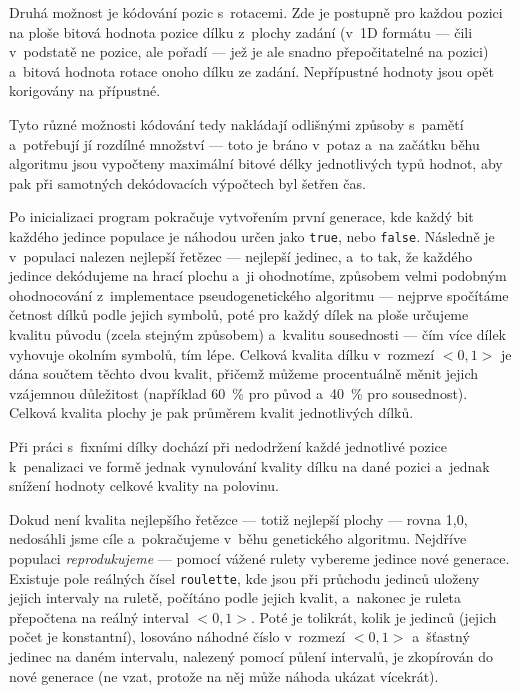 \documentclass[11pt, titlepage]{report}
\begin{document}
Druhá možnost je kódování pozic s~rotacemi. Zde je postupně pro každou pozici na ploše bitová hodnota pozice dílku z~plochy zadání (v~1D formátu --- čili v~podstatě ne pozice, ale pořadí --- jež je ale snadno přepočitatelné na pozici) a~bitová hodnota rotace onoho dílku ze zadání. Nepřípustné hodnoty jsou opět korigovány na přípustné.

Tyto různé možnosti kódování tedy nakládají odlišnými způsoby s~pamětí a~potřebují jí rozdílné množství --- toto je bráno v~potaz a~na začátku běhu algoritmu jsou vypočteny maximální bitové délky jednotlivých typů hodnot, aby pak při samotných dekódovacích výpočtech byl šetřen čas.

Po inicializaci program pokračuje vytvořením první generace, kde každý bit každého jedince populace je náhodou určen jako \texttt{true}, nebo \texttt{false}. Následně je v~populaci nalezen nejlepší řetězec --- nejlepší jedinec, a~to tak, že každého jedince dekódujeme na hrací plochu a~ji ohodnotíme, způsobem velmi podobným ohodnocování z~implementace pseudogenetického algoritmu --- nejprve spočítáme četnost dílků podle jejich symbolů, poté pro každý dílek na ploše určujeme kvalitu původu (zcela stejným způsobem) a~kvalitu sousednosti --- čím více dílek vyhovuje okolním symbolů, tím lépe. Celková kvalita dílku v~rozmezí $<0, 1>$ je dána součtem těchto dvou kvalit, přičemž můžeme procentuálně měnit jejich vzájemnou důležitost (například 60~\% pro původ a~40~\% pro sousednost). Celková kvalita plochy je pak průměrem kvalit jednotlivých dílků.

Při práci s~fixními dílky dochází při nedodržení každé jednotlivé pozice k~penalizaci ve formě jednak vynulování kvality dílku na dané pozici a~jednak snížení hodnoty celkové kvality na polovinu.

Dokud není kvalita nejlepšího řetězce --- totiž nejlepší plochy --- rovna 1,0, nedosáhli jsme cíle a~pokračujeme v~běhu genetického algoritmu. Nejdříve populaci \emph{reprodukujeme} --- pomocí vážené rulety vybereme jedince nové generace. Existuje pole reálných čísel \texttt{roulette}, kde jsou při průchodu jedinců uloženy jejich intervaly na ruletě, počítáno podle jejich kvalit, a~nakonec je ruleta přepočtena na reálný interval $<0, 1>$. Poté je tolikrát, kolik je jedinců (jejich počet je konstantní), losováno náhodné číslo v~rozmezí $<0, 1>$ a~šťastný jedinec na daném intervalu, nalezený pomocí půlení intervalů, je zkopírován do nové generace (ne vzat, protože na něj může náhoda ukázat vícekrát).
\end{document}
